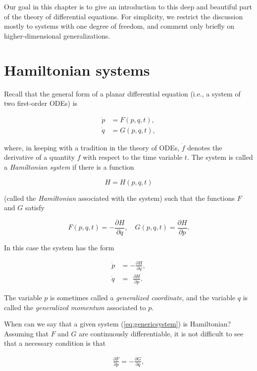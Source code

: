 \documentclass[11pt]{report}
\theoremstyle{plain}
\theoremstyle{definition}
\begin{document}
Our goal in this chapter is to give an introduction
to this deep and beautiful part of the theory of
differential equations. For simplicity, we restrict
the discussion mostly to systems with one degree of
freedom, and comment only briefly on
higher-dimensional generalizations.

\section{Hamiltonian systems}
Recall that the general form of a planar differential
equation (i.e., a system of two first-order ODEs) is

\begin{equation*} \tag{1}\label{eq:genericsystem}
\begin{split}
\dot{p} &= F(p,q,t), \\
\dot{q} &= G(p,q,t),
\end{split}
\end{equation*}

where, in keeping with a tradition in the theory of
ODEs, $\dot{f}$ denotes the derivative of a quantity
$f$ with respect to the time variable $t$. The system
is called a \emph{Hamiltonian system} if there is a
function

\[
H=H(p,q,t)
\]

(called the \emph{Hamiltonian} associated with the system)
such that the functions $F$ and $G$ satisfy

\[
F(p,q,t) = -\frac{\partial H}{\partial q}, \quad G(p,q,t) = \frac{\partial H}{\partial p}.
\]

In this case the system has the form

\begin{equation*} \tag{2}\label{eq:hamiltoniansystem}
\begin{split}
\dot{p} &= -\frac{\partial H}{\partial q}, \\
\dot{q} &= \ \ \frac{\partial H}{\partial p}.
\end{split}
\end{equation*}

The variable $p$ is sometimes called a \emph{generalized
coordinate}, and the variable $q$ is called the
\emph{generalized momentum} associated to $p$.

When can we say that a given system
(\ref{eq:genericsystem}) is Hamiltonian? Assuming that $F$
and $G$ are continuously differentiable, it is not
difficult to see that a necessary condition is that

\begin{equation*} \tag{3}\label{eq:hamiltonian-sufficient}
\begin{split}
\frac{\partial F}{\partial p} = -\frac{\partial G}{\partial q},
\end{split}
\end{equation*}
\end{document}
